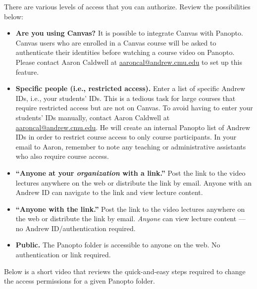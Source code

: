 \begin{gram}
	There are various levels of access that you can authorize. Review the possibilities below:

\begin{itemize}
		\item \textbf{Are you using Canvas?} It is possible to integrate Canvas with Panopto. Canvas users who are enrolled in a Canvas course will be asked to authenticate their identities before watching a course video on Panopto. Please contact Aaron Caldwell at \href{mailto:aaroncal@andrew.cmu.edu?subject=Canvas and Panopto}{aaroncal@andrew.cmu.edu} to set up this feature.
		\item \textbf{Specific people (i.e., restricted access).} Enter a list of specific Andrew IDs, i.e., your students’ IDs. This is a tedious task for large courses that require restricted access but are not on Canvas. To avoid having to enter your students’ IDs manually, contact Aaron Caldwell at \href{mailto:aaroncal@andrew.cmu.edu?subject=Restrict Course Access}{aaroncal@andrew.cmu.edu}. He will create an internal Panopto list of Andrew IDs in order to restrict course access to only course participants. In your email to Aaron, remember to note any teaching or administrative assistants who also require course access.
		\item \textbf{``Anyone at your \emph{organization} with a link.''} Post the link to the video lectures anywhere on the web or distribute the link by email. Anyone with an Andrew ID can navigate to the link and view lecture content.
		\item \textbf{``Anyone with the link.''} Post the link to the video lectures anywhere on the web or distribute the link by email. \emph{Anyone} can view lecture content --- no Andrew ID/authentication required.
		\item \textbf{Public.} The Panopto folder is accessible to anyone on the web. No authentication or link required.
	\end{itemize}
\end{gram}

\begin{gram}
	 Below is a short video that reviews the quick-and-easy steps required to change the access permissions for a given Panopto folder.

\end{gram}

